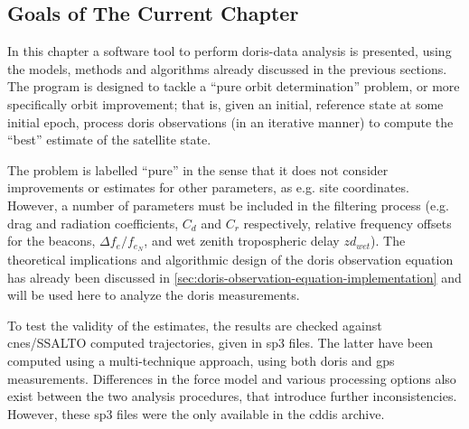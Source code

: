 \subsection{Goals of The Current Chapter}\label{ssec:jason3-pod-goals}

In this chapter a software tool to perform \gls{doris}-data analysis is presented, 
using the models, methods and algorithms already discussed in the previous sections.
The program is designed to tackle a ``pure orbit determination'' problem, or more 
specifically orbit improvement; that is, given an initial, reference state at some 
initial epoch, process \gls{doris} observations (in an iterative manner) to compute 
the ``best'' estimate of the satellite state.

The problem is labelled ``pure'' in the sense that it does not consider improvements 
or estimates for other parameters, as e.g. site coordinates. However, a number of 
parameters must be included in the filtering process (e.g. drag and radiation 
coefficients, $C_d$ and $C_r$ respectively, relative frequency offsets for the 
beacons, $\Delta f_e / f_{e_N}$, and wet zenith tropospheric delay $zd_{wet}$). The 
theoretical implications and algorithmic design of the \gls{doris} observation equation 
has already been discussed in \autoref{sec:doris-observation-equation-implementation} 
and will be used here to analyze the \gls{doris} measurements.

To test the validity of the estimates, the results are checked against \gls{cnes}/SSALTO 
computed trajectories, given in sp3 files. The latter have been computed using a 
multi-technique approach, using both \gls{doris} and \gls{gps} measurements. Differences 
in the force model and various processing options also exist between the two analysis 
procedures, that introduce further inconsistencies. However, these sp3 files were 
the only available in the \gls{cddis} archive.
